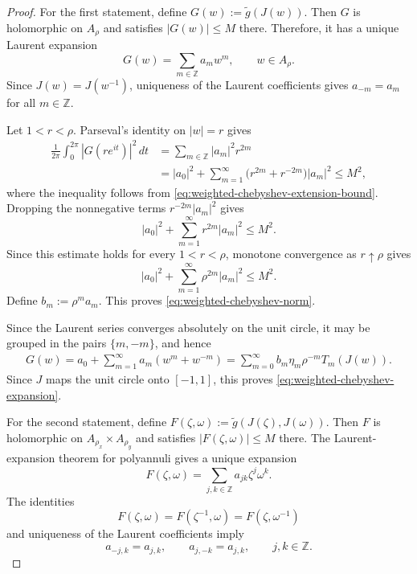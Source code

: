 \documentclass[11pt]{article}
\theoremstyle{definition}
\theoremstyle{remark}
\newcommand{\abs}[1]{\left\lvert #1\right\rvert}
\begin{document}
\begin{proof}
For the first statement, define
$
    G(w):=\widetilde g(J(w)).
$
Then $G$ is holomorphic on $A_\rho$ and satisfies
$\abs{G(w)}\le M$ there. Therefore, it has a unique Laurent expansion
\[
    G(w)=\sum_{m\in\mathbb Z}a_mw^m,
    \qquad
    w\in A_\rho.
\]
Since
$J(w)=J(w^{-1})$, uniqueness of the Laurent coefficients gives
$a_{-m}=a_m$ for all $m\in\mathbb Z$.

Let $1<r<\rho$.  Parseval's identity on $\abs{w}=r$ gives
\[
\begin{aligned}
    \frac1{2\pi}\int_0^{2\pi}
    \abs{G(re^{it})}^2\,dt
    &=
    \sum_{m\in\mathbb Z}\abs{a_m}^2r^{2m}\\
    &=
    \abs{a_0}^2+
    \sum_{m=1}^\infty
    \bigl(r^{2m}+r^{-2m}\bigr)\abs{a_m}^2
    \le M^2,
\end{aligned}
\]
where the inequality follows from
\eqref{eq:weighted-chebyshev-extension-bound}.  Dropping the nonnegative terms
$r^{-2m}\abs{a_m}^2$ gives
\[
    \abs{a_0}^2+
    \sum_{m=1}^\infty r^{2m}\abs{a_m}^2
    \le M^2.
\]
Since this estimate holds for every $1<r<\rho$, monotone convergence
as $r\uparrow\rho$ gives
\[
    \abs{a_0}^2+
    \sum_{m=1}^\infty \rho^{2m}\abs{a_m}^2
    \le M^2.
\]
Define $
    b_m:=\rho^ma_m$.
This proves \eqref{eq:weighted-chebyshev-norm}.

Since the Laurent series converges absolutely on the unit circle, it may
be grouped in the pairs $\{m,-m\}$, and hence
\[
\begin{aligned}
    G(w)
    =
    a_0+\sum_{m=1}^\infty a_m(w^m+w^{-m}) 
    =
    \sum_{m=0}^\infty
    b_m\eta_m\rho^{-m}T_m(J(w)).
\end{aligned}
\]
Since $J$ maps the unit circle onto $[-1, 1]$, this proves
\eqref{eq:weighted-chebyshev-expansion}.

For the second statement, define
$
    F(\zeta,\omega)
    :=
    \widetilde g(J(\zeta),J(\omega)).
$
Then $F$ is holomorphic on
$A_{\rho_x}\times A_{\rho_y}$ and satisfies
$\abs{F(\zeta,\omega)}\le M$ there.
The Laurent-expansion theorem for polyannuli
\cite[Theorem~1.118]{Scheidemann2023} gives a unique expansion
\[
    F(\zeta,\omega)
    =
    \sum_{j,k\in\mathbb Z}
    a_{jk}\zeta^j\omega^k.
\]
The identities
\[
    F(\zeta,\omega)
    =
    F(\zeta^{-1},\omega)
    =
    F(\zeta,\omega^{-1})
\]
and uniqueness of the Laurent coefficients imply
\[
    a_{-j,k}=a_{j,k},
    \qquad
    a_{j,-k}=a_{j,k},
    \qquad j,k\in\mathbb Z.
\]


\end{proof}
\end{document}
